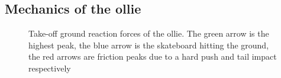 \subsection{Mechanics of the ollie} \label{ss_mechanics}
\begin{figure}[b]
\caption[Ollie ground reaction force]{Take-off ground reaction forces of the ollie. The green arrow is the highest peak, the blue arrow is the skateboard hitting the ground, the red arrows are friction peaks due to a hard push and tail impact respectively\cite{frederick_biomechanics_2006}}
\label{f_GRF}
\end{figure}

